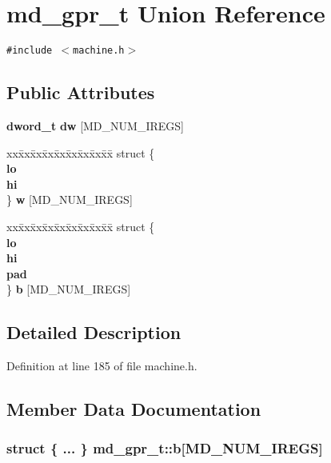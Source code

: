 \section{md\_\-gpr\_\-t Union Reference}
\label{unionmd__gpr__t}
{\tt \#include $<$machine.h$>$}

\subsection*{Public Attributes}
\begin{CompactItemize}
\item 
{\bf dword\_\-t} {\bf dw} [MD\_\-NUM\_\-IREGS]
\item 
\begin{tabbing}
xx\=xx\=xx\=xx\=xx\=xx\=xx\=xx\=xx\=\kill
struct \{\\
 {\bf lo}\\
 {\bf hi}\\
\} {\bf w} [MD\_NUM\_IREGS]\\

\end{tabbing}\item 
\begin{tabbing}
xx\=xx\=xx\=xx\=xx\=xx\=xx\=xx\=xx\=\kill
struct \{\\
 {\bf lo}\\
 {\bf hi}\\
 {\bf pad}\\
\} {\bf b} [MD\_NUM\_IREGS]\\

\end{tabbing}\end{CompactItemize}


\subsection{Detailed Description}


Definition at line 185 of file machine.h.

\subsection{Member Data Documentation}
\subsubsection[{b}]{\setlength{\rightskip}{0pt plus 5cm}struct \{ ... \}   {\bf md\_\-gpr\_\-t::b}[MD\_\-NUM\_\-IREGS]}\label{unionmd__gpr__t_d3d5d435b93368d9aa969a341a62a28a}


